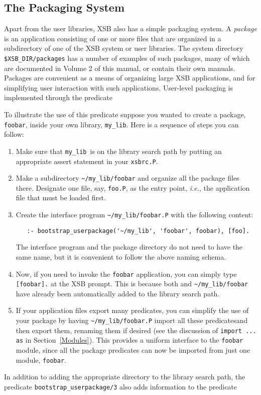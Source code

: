 \subsection{The Packaging System}
 Apart from the user libraries, XSB also has a simple
packaging system.  A {\em package\/} is an application consisting of
one or more files that are organized in a subdirectory of one of the
XSB system or user libraries.  The system directory
\verb|$XSB_DIR/packages| has a number of examples
of such packages, many of which are documented in Volume 2 of this
manual, or contain their own manuals.  Packages are convenient
as a means of organizing large XSB applications, and for simplifying
user interaction with such applications.  User-level packaging is
implemented through the predicate
\begin{description}
\end{description}
To illustrate the use of this predicate suppose you wanted to create a
package, {\tt foobar}, inside your own library, {\tt my\_lib}. Here is
a sequence of steps you can follow:
\begin{enumerate}
\item Make sure that {\tt my\_lib}\ is on the library search path by putting
  an appropriate assert statement in your {\tt xsbrc.P}.
\item Make a subdirectory \verb|~/my_lib/foobar| and organize all the
  package files there. Designate one file, say, {\tt foo.P}, as the
  entry point, {\it i.e.}, the application file that must be loaded first.
\item Create the interface program \verb|~/my_lib/foobar.P| with the
  following content:
    \begin{verbatim}
   :- bootstrap_userpackage('~/my_lib', 'foobar', foobar), [foo].
    \end{verbatim}
  The interface program and the package directory do not need to have the
  same name, but it is convenient to follow the above naming schema.
\item Now, if you need to invoke the {\tt foobar} application, you can
  simply type \verb|[foobar].| at the XSB prompt. This is because both and
  \verb|~/my_lib/foobar| have already been automatically added to the
  library search path.
\item If your application files export many predicates, you can
  simplify the use of your package by having \verb|~/my_lib/foobar.P|
  import all these predicatesand then export them, renaming them if
  desired (see the discussion of {\tt import ... as} in
  Section~\ref{Modules}).  This provides a uniform interface to the
  {\tt foobar} module, since all the package predicates can now be
  imported from just one module, {\tt foobar}.
\end{enumerate}
In addition to adding the appropriate directory to the library search
path, the predicate \verb|bootstrap_userpackage/3| also adds
information to the predicate


